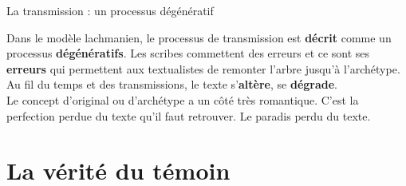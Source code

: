 \documentclass[11pt]{beamer}
\begin{document}
\begin{frame}{La transmission : un processus dégénératif}
\begin{block}{}
    Dans le modèle lachmanien, le processus de transmission est \textbf{décrit} comme un processus \textbf{dégénératifs}. Les scribes commettent des erreurs et ce sont ses \textbf{erreurs} qui permettent aux textualistes de remonter l'arbre jusqu'à l'archétype. Au fil du temps et des transmissions, le texte s'\textbf{altère}, se \textbf{dégrade}.\\

    Le concept d'original ou d'archétype a un côté très romantique. C'est la perfection perdue du texte qu'il faut retrouver. Le paradis perdu du texte.
\end{block}
    
\end{frame}

\section{La vérité du témoin}
\end{document}
